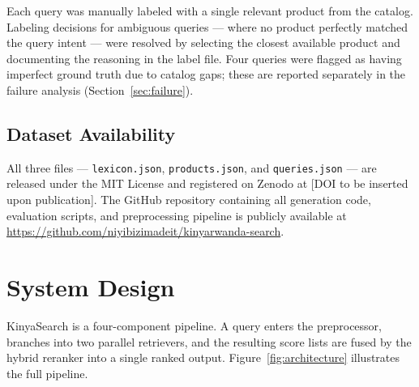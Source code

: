 \documentclass[11pt,a4paper]{article}
\begin{document}
Each query was manually labeled with a single relevant product from the
catalog. Labeling decisions for ambiguous queries — where no product
perfectly matched the query intent — were resolved by selecting the closest
available product and documenting the reasoning in the label file. Four
queries were flagged as having imperfect ground truth due to catalog gaps;
these are reported separately in the failure analysis (Section~\ref{sec:failure}).

\subsection{Dataset Availability}

All three files — \texttt{lexicon.json}, \texttt{products.json}, and
\texttt{queries.json} — are released under the MIT License and registered
on Zenodo at [DOI to be inserted upon publication]. The GitHub repository
containing all generation code, evaluation scripts, and preprocessing
pipeline is publicly available at
\url{https://github.com/niyibizimadeit/kinyarwanda-search}.

\section{System Design}
\label{sec:system}

KinyaSearch is a four-component pipeline. A query enters the preprocessor,
branches into two parallel retrievers, and the resulting score lists are
fused by the hybrid reranker into a single ranked output.
Figure~\ref{fig:architecture} illustrates the full pipeline.

\usetikzlibrary{positioning, calc}
\end{document}
